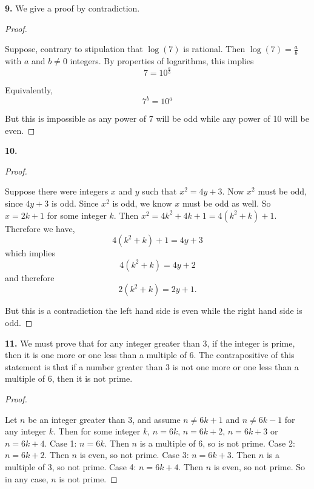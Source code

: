 \documentclass[10pt,]{book}
\theoremstyle{plain}
\theoremstyle{definition}
\theoremstyle{definition}
\theoremstyle{definition}
\numberwithin{equation}{chapter}
\begin{document}
\par\smallskip
\noindent\textbf{9.}\quad{}
We give a proof by contradiction.
%
\begin{proof}\hypertarget{proof-49}{}

Suppose, contrary to stipulation that \(\log(7)\) is rational. Then \(\log(7) = \frac{a}{b}\) with \(a\) and \(b \ne 0\) integers. By properties of logarithms, this implies
\begin{equation*}
  7 = 10^{\frac{a}{b}}
\end{equation*}
%
\par

Equivalently,
\begin{equation*}
  7^b = 10^a
\end{equation*}
%
\par

But this is impossible as any power of 7 will be odd while any power of 10 will be even.
%
\end{proof}
\par\smallskip
\noindent\textbf{10.}\quad{}\begin{proof}\hypertarget{proof-50}{}

Suppose there were integers \(x\) and \(y\) such that \(x^2 = 4y + 3\). Now \(x^2\) must be odd, since \(4y + 3\) is odd. Since \(x^2\) is odd, we know \(x\) must be odd as well. So \(x = 2k + 1\) for some integer \(k\). Then \(x^2 = 4k^2 + 4k + 1 = 4(k^2 + k) + 1\). Therefore we have,
\begin{equation*}
  4(k^2 + k) + 1 = 4y + 3
\end{equation*}
which implies
\begin{equation*}
  4(k^2 + k) = 4y + 2
\end{equation*}
and therefore
\begin{equation*}
  2(k^2 + k) = 2y + 1.
\end{equation*}
%
\par

But this is a contradiction \textendash{} the left hand side is even while the right hand side is odd.
%
\end{proof}
\par\smallskip
\noindent\textbf{11.}\quad{}
We must prove that for any integer greater than 3, if the integer is prime, then it is one more or one less than a multiple of 6. The contrapositive of this statement is that if a number greater than 3 is not one more or one less than a multiple of 6, then it is not prime.
%
\begin{proof}\hypertarget{proof-51}{}

Let \(n\) be an integer greater than 3, and assume \(n \ne 6k+1\) and \(n \ne 6k-1\) for any integer \(k\). Then for some integer \(k\), \(n = 6k\), \(n = 6k+2\), \(n = 6k+3\) or \(n = 6k+4\). Case 1: \(n = 6k\). Then \(n\) is a multiple of 6, so is not prime. Case 2: \(n = 6k+2\). Then \(n\) is even, so not prime. Case 3: \(n = 6k+3\). Then \(n\) is a multiple of 3, so not prime. Case 4: \(n = 6k+4\). Then \(n\) is even, so not prime. So in any case, \(n\) is not prime.
%
\end{proof}
\end{document}
